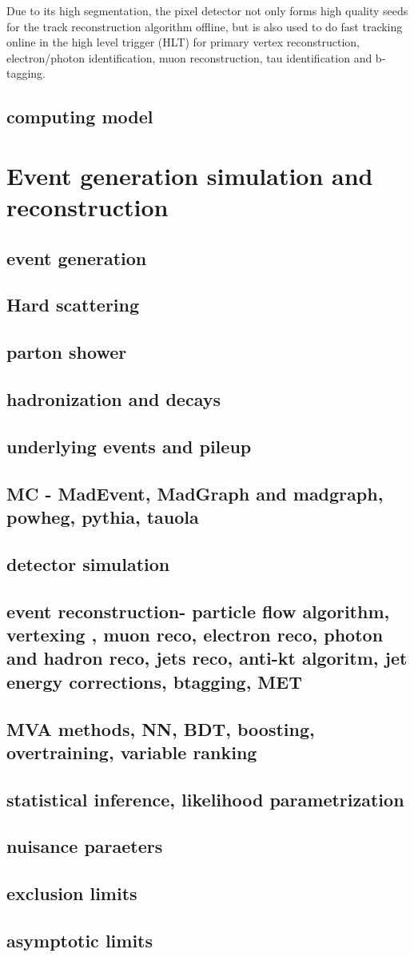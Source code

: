 Due to its high segmentation, the pixel detector not only forms high quality seeds for
the track reconstruction algorithm offline, but is also used to do fast tracking online in the high
level trigger (HLT) for primary vertex reconstruction, electron/photon identification, muon
reconstruction, tau identification and b-tagging.



\subsection{ computing model}
\section{Event generation  simulation and reconstruction}
\subsection{ event generation}
\subsection{Hard scattering  }
\subsection{parton shower }
\subsection{hadronization and decays }
\subsection{underlying events and pileup }
\subsection{ MC - MadEvent, MadGraph and madgraph\@NLO, powheg, pythia, tauola}
\subsection{ detector simulation}
\subsection{event reconstruction- particle flow algorithm, vertexing , muon reco, electron reco, photon and hadron reco, jets reco, anti-kt algoritm, jet energy corrections, btagging, MET  }
\subsection{ MVA methods, NN, BDT, boosting, overtraining, variable ranking  }
\subsection{statistical inference, likelihood parametrization}
\subsection{ nuisance paraeters}
\subsection{exclusion limits }
\subsection{asymptotic limits }

